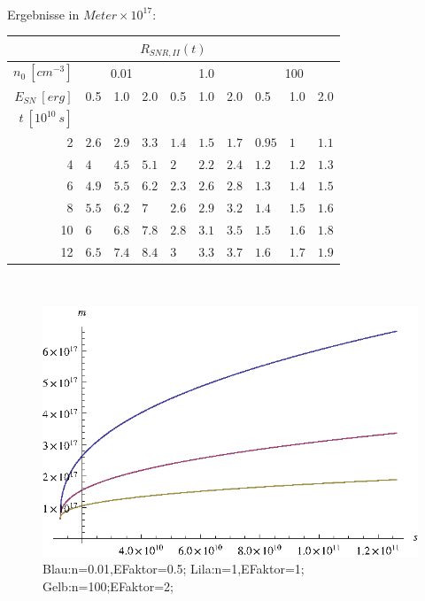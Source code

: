 \\
Ergebnisse in $Meter \times 10^{17}$:
\begin{center}
\begin{tabular}{|r|l|l|l|l|l|l|l|l|l|}
\multicolumn{10}{c}{\(R_{SNR,II}(t)\)}\\
\hline
\(n_0~[cm^{-3}]\) & \multicolumn{3}{|c|}{0.01} & \multicolumn{3}{|c|}{1.0} & \multicolumn{3}{|c|}{100}\\
\hline
\(E_{SN}~[erg]\) & 0.5 & 1.0 & 2.0 & 0.5 & 1.0 & 2.0 & 0.5 & 1.0 & 2.0\\
\hline
\(t~[10^{10}~s]\) & & & & & & & & & \\
\cline{1-1}
2 & $2.6$ & $2.9$ & $3.3$ &
$1.4$ & $1.5$ & $1.7$ &
$0.95$ & $1$ & $1.1$ \\

4 & $4$ & $4.5$ & $5.1$ &
$2$ & $2.2$ & $2.4$ &
$1.2$ & $1.2$ & $1.3$ \\

6 & $4.9$ & $5.5$ & $6.2$ &
$2.3$ & $2.6$ & $2.8$ &
$1.3$ & $1.4$ & $1.5$\\

8 & $5.5$ & $6.2$ & $7$ &
$2.6$ & $2.9$ & $3.2$ &
$1.4$ & $1.5$ & $1.6$\\

10 & $6$ & $6.8$ & $7.8$ &
$2.8$ & $3.1$ & $3.5$ &
$1.5$ & $1.6$ & $1.8$ \\

12 & $6.5$ & $7.4$ & $8.4$&
$3$ & $3.3$ & $3.7$ &
$1.6$ & $1.7$ & $1.9$ \\

\hline
\end{tabular}\\
\end{center}
\begin{figure}[ht]
\begin{center}
\includegraphics{aufgabe6r.eps}
\end{center}
\caption[Bildunterschrift]{Blau:n=0.01,EFaktor=0.5; Lila:n=1,EFaktor=1; Gelb:n=100;EFaktor=2;}
\end{figure}
